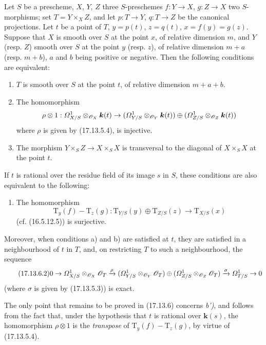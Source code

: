 \begin{corollary}[17.13.6]\label{IV.17.13.6}
Let $S$ be a prescheme, $X$, $Y$, $Z$ three $S$-preschemes $f:Y\to X$, $g:Z\to X$ two $S$-morphisms; set $T=Y\times_XZ$, and let $p:T\to Y$, $q:T\to Z$ be the canonical projections. Let $t$ be a point of $T$, $y=p(t)$, $z=q(t)$, $x=f(y)=g(z)$. Suppose that $X$ is smooth over $S$ at the point $x$, of relative dimension $m$, and $Y$ \textup{(resp. $Z$)} smooth over $S$ at the point $y$ \textup{(resp. $z$)}, of relative dimension $m+a$ \textup{(resp. $m+b$)}, $a$ and $b$ being positive or negative. Then the following conditions are equivalent:
\begin{enumerate}
  \item[\textup{a)}] $T$ is smooth over $S$ at the point $t$, of relative dimension $m+a+b$.
  \item[\textup{b)}] The homomorphism
  \[
  \rho\otimes1:\varOmega^1_{X/S}\otimes_{\mathscr{O}_X}\boldsymbol{k}(t)\to
  (\varOmega^1_{Y/S}\otimes_{\mathscr{O}_Y}\boldsymbol{k}(t))\oplus
  (\varOmega^1_{Z/S}\otimes_{\mathscr{O}_Z}\boldsymbol{k}(t))
  \]
  where $\rho$ is given by \textup{(17.13.5.4)}, is injective.
  \item[\textup{c)}] The morphism $Y\times_SZ\to X\times_SX$ is transversal to the diagonal of $X\times_SX$ at the point $t$.
\end{enumerate}
If $t$ is rational over the residue field of its image $s$ in $S$, these conditions are also equivalent to the following:
\begin{enumerate}
  \item[\textup{b$'$)}] The homomorphism
  \[
  \label{IV.17.13.6.1}
  \tag{17.13.6.1}
  \mathrm{T}_y(f)-\mathrm{T}_z(g):\mathrm{T}_{Y/S}(y)\oplus\mathrm{T}_{Z/S}(z)\to\mathrm{T}_{X/S}(x)
  \]
  \textup{(cf. (16.5.12.5))} is surjective.
\end{enumerate}
Moreover, when conditions \textup{a)} and \textup{b)} are satisfied at $t$, they are satisfied in a neighbourhood of $t$ in $T$, and, on restricting $T$ to such a neighbourhood, the sequence
\[
\label{IV.17.13.6.2}
\tag{17.13.6.2}
0\to\varOmega^1_{X/S}\otimes_{\mathscr{O}_X}\mathscr{O}_T\xrightarrow{\rho}
(\varOmega^1_{Y/S}\otimes_{\mathscr{O}_Y}\mathscr{O}_T)\oplus
(\varOmega^1_{Z/S}\otimes_{\mathscr{O}_Z}\mathscr{O}_T)
\xrightarrow{\sigma}\varOmega^1_{T/S}\to0
\]
\textup{(}where $\sigma$ is given by \textup{(17.13.5.3))} is exact.
\end{corollary}

The only point that remains to be proved in (17.13.6) concerns \emph{b')}, and follows from the fact that, under the hypothesis that $t$ is rational over $\boldsymbol{k}(s)$, the homomorphism $\rho\otimes1$ is the \emph{transpose} of $\mathrm{T}_y(f)-\mathrm{T}_z(g)$, by virtue of (17.13.5.4).

